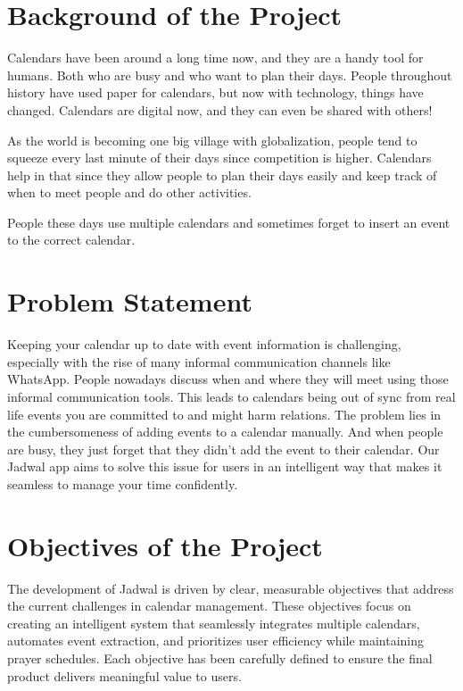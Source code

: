 \documentclass[12pt,a4paper,twoside]{report}
\begin{document}
\section{Background of the Project}

Calendars have been around a long time now, and they are a handy tool for humans. Both who are busy and who want to plan their days. People throughout history have used paper for calendars, but now with technology, things have changed. Calendars are digital now, and they can even be shared with others!

As the world is becoming one big village with globalization, people tend to squeeze every last minute of their days since competition is higher. Calendars help in that since they allow people to plan their days easily and keep track of when to meet people and do other activities.

People these days use multiple calendars and sometimes forget to insert an event to the correct calendar.

\section{Problem Statement}

Keeping your calendar up to date with event information is challenging, especially with the rise of many informal communication channels like WhatsApp. People nowadays discuss when and where they will meet using those informal communication tools. This leads to calendars being out of sync from real life events you are committed to and might harm relations. The problem lies in the cumbersomeness of adding events to a calendar manually. And when people are busy, they just forget that they didn't add the event to their calendar. Our Jadwal app aims to solve this issue for users in an intelligent way that makes it seamless to manage your time confidently.

\section{Objectives of the Project}

The development of Jadwal is driven by clear, measurable objectives that address the current challenges in calendar management. These objectives focus on creating an intelligent system that seamlessly integrates multiple calendars, automates event extraction, and prioritizes user efficiency while maintaining prayer schedules. Each objective has been carefully defined to ensure the final product delivers meaningful value to users.
\end{document}
